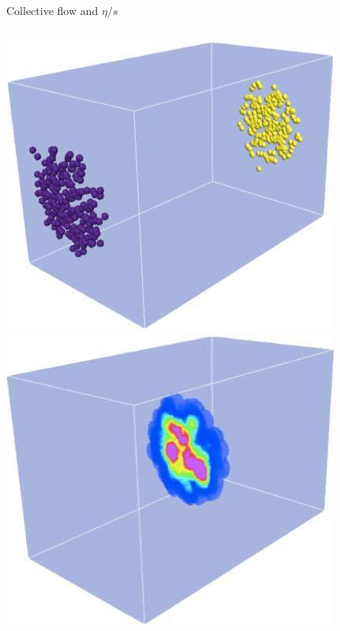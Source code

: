 \documentclass{beamer}
\begin{document}
\begin{frame}{Collective flow and $\eta/s$}
  \begin{columns}
    \includegraphics[width=\textwidth]{third_party/evolution1} \\
    \includegraphics[width=\textwidth]{third_party/evolution2} \\

\end{columns}
\end{frame}
\end{document}
